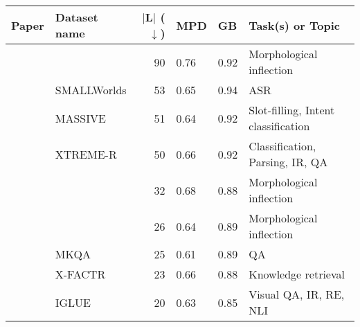 \begin{tabular}{llrlll}
	\toprule
	\textbf{Paper}                                & \textbf{Dataset name}  & \textbf{$|$L$|$ ($\downarrow$)} & \textbf{MPD}                    & \textbf{GB}                     & \textbf{Task(s) or Topic}           \\\midrule
	\citet{vylomova-etal-2020-sigmorphon}         &                        & 90                              & 0.76\lowcov                     & 0.92\missing                    & Morphological inflection            \\
	\citet{henrichsen-uneson-2012-smallworlds}    & SMALLWorlds            & 53                              & 0.65\lowcov                     & \cellcolor{high-color!40}  0.94 & ASR                                 \\
	\citet{fitzgerald-etal-2023-massive}          & MASSIVE                & 51                              & 0.64\lowcov                     & 0.92                            & Slot-filling, Intent classification \\
	\citet{ruder-etal-2021-xtreme}                & XTREME-R               & 50                              & 0.66\lowcov                     & 0.92\missing                    & Classification, Parsing, IR, QA     \\
	\citet{kodner-etal-2022-sigmorphon}           &                        & 32\nolang                       & 0.68\lowcov                     & 0.88\missing                    & Morphological inflection            \\
	\citet{goldman-etal-2023-sigmorphon}          &                        & 26                              & 0.64                            & 0.89                            & Morphological inflection            \\
	\citet{longpre-etal-2021-mkqa}                & MKQA                   & 25                              & 0.61                            & 0.89                            & QA                                  \\
	\citet{jiang-etal-2020-x}                     & X-FACTR                & 23                              & 0.66\lowcov                     & 0.88                            & Knowledge retrieval                 \\
	\citet{bugliarello2022iglue}                  & IGLUE                  & 20                              & 0.63                            & 0.85                            & Visual QA, IR, RE, NLI              \\

\end{tabular}
